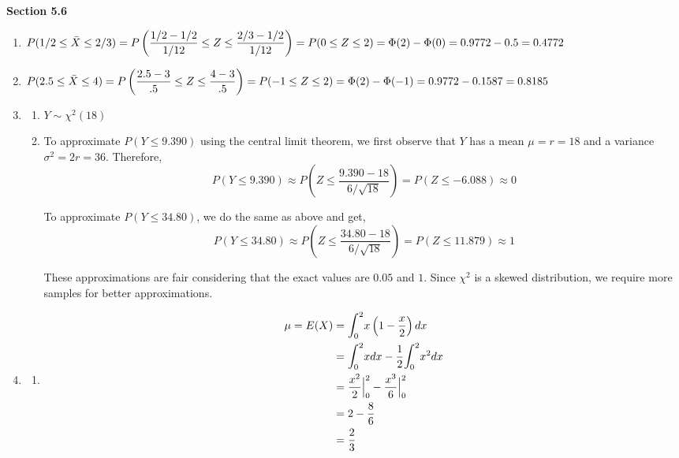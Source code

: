 \documentclass{article}
\newcommand\lint{\mathlarger{\int}}
\newcommand\myskip[1]{\addtocounter{enumi}{#1}}
\begin{document}
    \textbf{Section 5.6}
    \begin{enumerate}
     \item 
      $P(1/2 \le \bar{X} \le 2/3) = P\left(\dfrac{1/2 - 1/2}{1/12} \le Z \le \dfrac{2/3 - 1/2}{1/12}\right) 
       = P(0 \le Z \le 2) \\ = \Phi(2) - \Phi(0) = 0.9772 - 0.5 = 0.4772$
     \myskip{1}
     
     \item
      $P(2.5 \le \bar{X} \le 4) = P\left(\dfrac{2.5 - 3}{.5} \le Z \le \dfrac{4 - 3}{.5}\right)
	= P(-1 \le Z \le 2) \\ = \Phi(2) - \Phi(-1) = 0.9772 - 0.1587 = 0.8185$
     \myskip{1}
     
     \item
      \begin{enumerate}
       \item 
	$Y \sim \chi^2(18)$
	
       \item
	To approximate $P(Y \le 9.390)$ using the central limit theorem, we first observe that $Y$ has
	a mean $\mu = r = 18$ and a variance $\sigma^2 = 2r = 36$. Therefore,
	$$P(Y \le 9.390) \approx P\left(Z \le \dfrac{9.390 - 18}{6/\sqrt{18}}\right) = P(Z \le -6.088)
	  \approx 0$$
	  
	To approximate $P(Y \le 34.80)$, we do the same as above and get,
	$$P(Y \le 34.80) \approx P\left(Z \le \dfrac{34.80 - 18}{6/\sqrt{18}}\right) = P(Z \le 11.879)
	  \approx 1$$
	  
	These approximations are fair considering that the exact values are $0.05$ and $1$. Since 
	$\chi^2$ is a skewed distribution, we require more samples for better approximations.
      \end{enumerate}
     
     \item
      \begin{enumerate}
       \item
	\begin{align*}
	 \mu = E(X) &= \lint_0^2{x \left(1 - \dfrac{x}{2}\right)dx}  \\
	  &= \lint_0^2 { x dx} - \dfrac{1}{2}\lint_0^2{x^2 dx} \\
	  &= \dfrac{x^2}{2}\Big|_0^2 - \dfrac{x^3}{6}\Big|_0^2 \\
	  &= 2 - \dfrac{8}{6} \\
	  &= \dfrac{2}{3}
	\end{align*}
	

\end{enumerate}
\end{enumerate}
\end{document}
